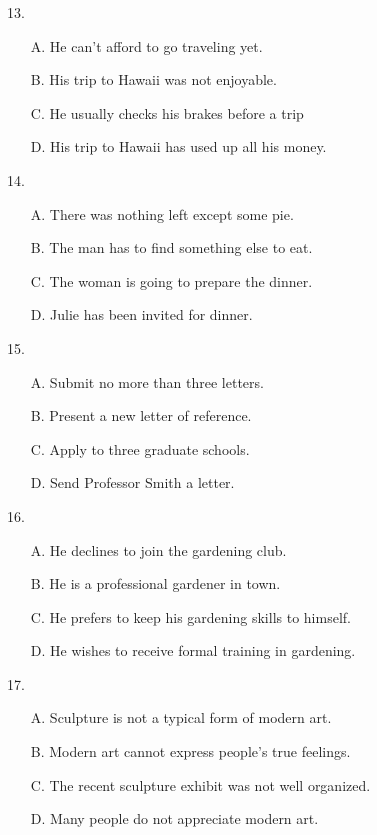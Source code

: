 \documentclass[UTF8,11pt]{ctexart}
\begin{document}
13.


\begin{itemize}[leftmargin=2em,itemsep=.2em,topsep=.4em]\item[A.] He can't afford to go traveling yet.
\item[B.] His trip to Hawaii was not enjoyable.
\item[C.] He usually checks his brakes before a trip
\item[D.] His trip to Hawaii has used up all his money.
\end{itemize}

14.


\begin{itemize}[leftmargin=2em,itemsep=.2em,topsep=.4em]\item[A.] There was nothing left except some pie.
\item[B.] The man has to find something else to eat.
\item[C.] The woman is going to prepare the dinner.
\item[D.] Julie has been invited for dinner.
\end{itemize}

15.


\begin{itemize}[leftmargin=2em,itemsep=.2em,topsep=.4em]\item[A.] Submit no more than three letters.
\item[B.] Present a new letter of reference.
\item[C.] Apply to three graduate schools.
\item[D.] Send Professor Smith a letter.
\end{itemize}

16.


\begin{itemize}[leftmargin=2em,itemsep=.2em,topsep=.4em]\item[A.] He declines to join the gardening club.
\item[B.] He is a professional gardener in town.
\item[C.] He prefers to keep his gardening skills to himself.
\item[D.] He wishes to receive formal training in gardening.
\end{itemize}

17.


\begin{itemize}[leftmargin=2em,itemsep=.2em,topsep=.4em]\item[A.] Sculpture is not a typical form of modern art.
\item[B.] Modern art cannot express people's true feelings.
\item[C.] The recent sculpture exhibit was not well organized.
\item[D.] Many people do not appreciate modern art.
\end{itemize}
\end{document}
